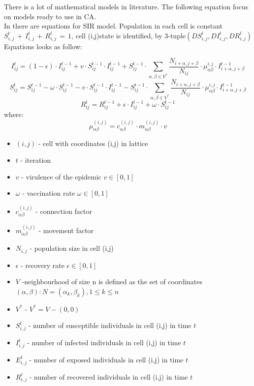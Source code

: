 \documentclass[a4paper, 11pt]{article}
\begin{document}
	
	
	There is a lot of mathematical models in literature. The following equation focus on models ready to use in CA.\\
	In \cite{WHITE} there are equations for SIR model. Population in each cell is constant $S^{t}_{i,j}\,+\,I^{t}_{i,j}\,+\,R^{t}_{i,j}\,=\,1$, cell (i,j)state is identified, by 3-tuple$(DS^{t}_{i,j},DI^{t}_{i,j},DR^{t}_{i,j})$ Equations looks as follow:
	
	\begin{equation}
	I^t_{ij}=\left(1-\epsilon\right)\cdot I^{t-1}_{ij}+v\cdot S^{t-1}_{ij}\cdot I^{t-1}_{ij}+S^{t-1}_{ij} \cdot \sum\limits_{\alpha,\beta\in V^{*}}\frac{N_{i+\alpha,j+\beta}}{N_{ij}}\cdot \mu^{i,j}_{\alpha\beta}\cdot I^{t-1}_{i+\alpha,j+\beta} 
	\end{equation}		
		\begin{equation}
	S^t_{ij}=S^{t-1}_{ij}-\omega\cdot S^{t-1}_{ij}-v\cdot S^{t-1}_{ij}\cdot I^{t-1}_{ij}-S^{t-1}_{ij} \cdot \sum\limits_{\alpha,\beta\in V^{*}}\frac{N_{i+\alpha,j+\beta}}{N_{ij}}\cdot \mu^{i,j}_{\alpha\beta}\cdot I^{t-1}_{i+\alpha,j+\beta} 
\end{equation}	
	\begin{equation}
	R^t_{ij}=R^{t-1}_{ij}+\epsilon\cdot I^{t-1}_{ij}+\omega\cdot S^{t-1}_{ij}
\end{equation}	
	where:
		\begin{equation}
	\mu^{(i,j)}_{\alpha\beta}= c^{(i,j)}_{\alpha\beta}\cdot m^{(i,j)}_{\alpha\beta} \cdot v
\end{equation}
	\begin{itemize}
	\item $(i,j)$ - cell with coordinates (i,j) in lattice
	\item $t$ - iteration
	\item $v$ - virulence of the epidemic  $v \in \left[0,1\right]$
	\item $\omega$ -  vaccination rate $\omega \in \left[0,1\right]$
	\item $c^{(i,j)}_{\alpha\beta}$ - connection factor
	\item $ m^{(i,j)}_{\alpha\beta}$ - movement factor
	\item $N_{i,j}$ - population size in cell (i,j)
	\item $\epsilon$ - recovery rate $\epsilon \in \left[0,1\right]$
	\item $V$ -neighbourhood of size n is defined as the set of coordinates $(\alpha,\beta): N={(\alpha_k,\beta_k),1\leq k \leq n}$
	\item $V^{*}$ - $ V^{*}= V-{(0,0)} $ 
	\item $S^{t}_{i,j}$ - number of susceptible individuals in cell (i,j) in time $t$
	\item $I^{t}_{i,j}$ - number of infected individuals in cell (i,j) in time $t$
	\item $E^{t}_{i,j}$ - number of exposed individuals in cell (i,j) in time $t$
	\item $R^{t}_{i,j}$ - number of recovered individuals in cell (i,j) in time $t$
	\end{itemize}	
	
\end{document}
